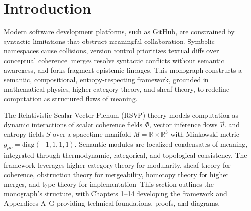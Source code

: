 \section{Introduction}
\label{sec:introduction}

Modern software development platforms, such as GitHub, are constrained by syntactic limitations that obstruct meaningful collaboration. Symbolic namespaces cause collisions, version control prioritizes textual diffs over conceptual coherence, merges resolve syntactic conflicts without semantic awareness, and forks fragment epistemic lineages. This monograph constructs a semantic, compositional, entropy-respecting framework, grounded in mathematical physics, higher category theory, and sheaf theory, to redefine computation as structured flows of meaning.

The Relativistic Scalar Vector Plenum (RSVP) theory models computation as dynamic interactions of scalar coherence fields $\Phi$, vector inference flows $\vec{v}$, and entropy fields $S$ over a spacetime manifold $M = \mathbb{R} \times \mathbb{R}^3$ with Minkowski metric $g_{\mu\nu} = \text{diag}(-1, 1, 1, 1)$. Semantic modules are localized condensates of meaning, integrated through thermodynamic, categorical, and topological consistency. The framework leverages higher category theory for modularity, sheaf theory for coherence, obstruction theory for mergeability, homotopy theory for higher merges, and type theory for implementation. This section outlines the monograph’s structure, with Chapters 1–14 developing the framework and Appendices A–G providing technical foundations, proofs, and diagrams.

\begin{center}
\end{center}

